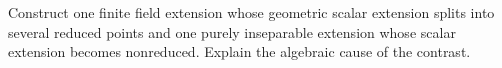 \begin{problem}\label{chall:vi25-03}
Construct one finite field extension whose geometric scalar extension splits into several reduced points and one purely inseparable extension whose scalar extension becomes nonreduced. Explain the algebraic cause of the contrast.
\end{problem}
